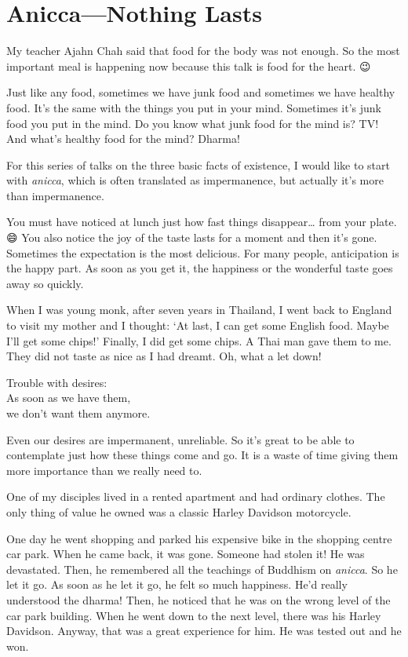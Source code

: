 \documentclass[12pt, openany]{book}
\newenvironment{aphorism}%
{%
\begin{center}\begin{itshape}
}%
{\end{itshape}\end{center}
}%
\newcommand{\fleuron}{%
\begin{center}
\vspace{2em}
\fallbackfont{❦}
\end{center}
}
\begin{document}
\fleuron

\chapter{Anicca—Nothing Lasts} 

My teacher Ajahn Chah said that food for the body was not enough. So the most important meal is happening now because this talk is food for the heart. 😉

Just like any food, sometimes we have junk food and sometimes we have healthy food. It’s the same with the things you put in your mind. Sometimes it’s junk food you put in the mind. Do you know what junk food for the mind is? TV! And what’s healthy food for the mind? Dharma! 

For this series of talks on the three basic facts of existence, I would like to start with \emph{anicca}, which is often translated as impermanence, but actually it’s more than impermanence. 

You must have noticed at lunch just how fast things disappear… from your plate. 😄 You also notice the joy of the taste lasts for a moment and then it’s gone. Sometimes the expectation is the most delicious. For many people, anticipation is the happy part. As soon as you get it, the happiness or the wonderful taste goes away so quickly. 

When I was young monk, after seven years in Thailand, I went back to England to visit my mother and I thought: ‘At last, I can get some English food. Maybe I’ll get some chips!’ Finally, I did get some chips. A Thai man gave them to me. They did not taste as nice as I had dreamt. Oh, what a let down! 

\begin{aphorism}
Trouble with desires:\\  
As soon as we have them,\\ 
we don’t want them anymore.
\end{aphorism}

Even our desires are impermanent, unreliable. So it’s great to be able to contemplate just how these things come and go. It is a waste of time giving them more importance than we really need to. 

One of my disciples lived in a rented apartment and had ordinary clothes. The only thing of value he owned was a classic Harley Davidson motorcycle. 

One day he went shopping and parked his expensive bike in the shopping centre car park. When he came back, it was gone. Someone had stolen it! He was devastated. Then, he remembered all the teachings of Buddhism on \emph{anicca}. So he let it go. As soon as he let it go, he felt so much happiness. He’d really understood the dharma! Then, he noticed that he was on the wrong level of the car park building. When he went down to the next level, there was his Harley Davidson. Anyway, that was a great experience for him. He was tested out and he won. 
\end{document}
